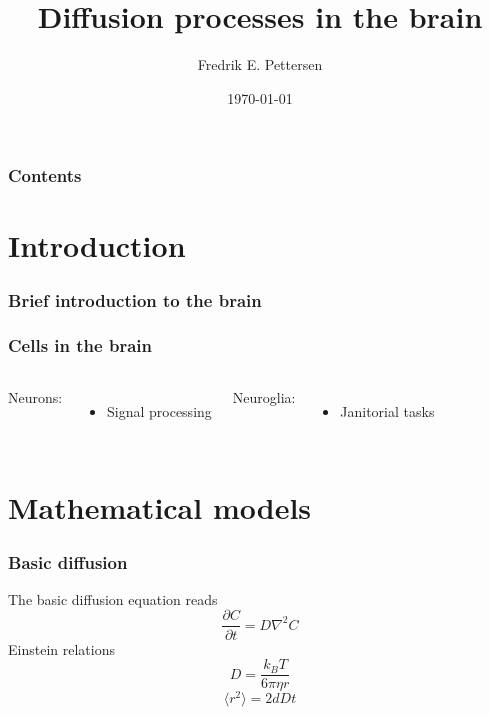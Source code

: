 \documentclass{beamer}
\title[Presentation - Kongsberg Defence \& Aerospace]{Diffusion processes in the brain}
\author{Fredrik E. Pettersen}
\date{\today}
\renewcommand{\d}{\partial}
\begin{document}
\begin{frame}
\titlepage
\end{frame}



\begin{frame}
 \frametitle{Contents}
 \tableofcontents[hideallsubsections]
\end{frame}

\section{Introduction}
\begin{frame}
 \frametitle{Brief introduction to the brain}
\end{frame}

\begin{frame}
 \frametitle{Cells in the brain}
 \begin{columns}
\column{2.0in} Neurons:\\
\begin{itemize}
 \item Signal processing
\end{itemize}

\column{2.0in} Neuroglia:\\
\begin{itemize}
 \item Janitorial tasks
\end{itemize}
 \end{columns}
\end{frame}


\section{Mathematical models}

\begin{frame}
 \frametitle{Basic diffusion}
 The basic diffusion equation reads
 \begin{equation}
  \frac{\d C}{\d t} = D\nabla^2C
 \end{equation}
Einstein relations
\begin{equation}
 D = \frac{k_B T}{6\pi\eta r}
\end{equation}
\begin{equation}
 \langle r^2\rangle = 2dDt
\end{equation}
\end{frame}
\end{document}
